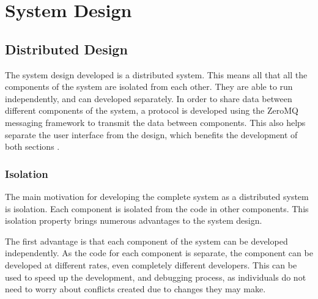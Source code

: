 
\chapter{System Design} %
\label{sec:design}


\ifpdf
    \graphicspath{{4/figures/PNG/}{4/figures/PDF/}{4/figures/}}
\else
    \graphicspath{{4/figures/EPS/}{4/figures/}}
\fi


\section{Distributed Design}
\label{sec:design}

The system design developed is a distributed system. This means all that all the components of the system are isolated from each other. They are able to run independently, and can developed separately. In order to share data between different components of the system, a protocol is developed using the ZeroMQ messaging framework to transmit the data between components. This also helps separate the user interface from the design, which benefits the development of both sections \cite{protosnak_modular}.

\subsection{Isolation}

The main motivation for developing the complete system as a distributed system is isolation. Each component is isolated from the code in other components. This isolation property brings numerous advantages to the system design. 

The first advantage is that each component of the system can be developed independently. As the code for each component is separate, the component can be developed at different rates, even completely different developers. This can be used to speed up the development, and debugging process, as individuals do not need to worry about conflicts created due to changes they may make.

